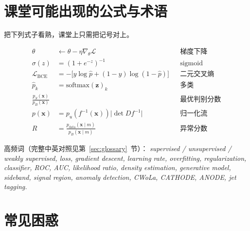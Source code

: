 \documentclass[11pt,a4paper]{article}
\theoremstyle{definition}
\theoremstyle{plain}
\theoremstyle{remark}
\newcommand{\sigm}{\sigma}
\newcommand{\loss}{\mathcal{L}}
\begin{document}
\section{课堂可能出现的公式与术语}
\label{sec:classroom}

把下列式子看熟，课堂上只需把记号对上。

\begin{align}
  \theta&\leftarrow\theta-\eta\nabla_\theta\loss
  && \text{梯度下降}\\
  \sigm(z)&=(1+e^{-z})^{-1}
  && \text{sigmoid}\\
  \loss_{\mathrm{BCE}}&=-\bigl[y\log\hat p+(1-y)\log(1-\hat p)\bigr]
  && \text{二元交叉熵}\\
  \hat p_k&=\mathrm{softmax}(\mathbf{z})_k
  && \text{多类}\\
  \frac{p_S(\mathbf{x})}{p_B(\mathbf{x})}
  &&& \text{最优判别分数}\\
  p(\mathbf{x})&=p_u(f^{-1}(\mathbf{x}))\bigl|\det Df^{-1}\bigr|
  && \text{归一化流}\\
  R&=\frac{p_{\mathrm{data}}(\mathbf{x}\mid m)}{p_B(\mathbf{x}\mid m)}
  && \text{异常分数}
\end{align}

高频词（完整中英对照见第~\ref{sec:glossary}~节）：
\textit{supervised / unsupervised / weakly supervised, loss, gradient descent, learning rate, overfitting, regularization, classifier, ROC, AUC, likelihood ratio, density estimation, generative model, sideband, signal region, anomaly detection, CWoLa, CATHODE, ANODE, jet tagging.}

\section{常见困惑}
\label{sec:faq}
\end{document}
